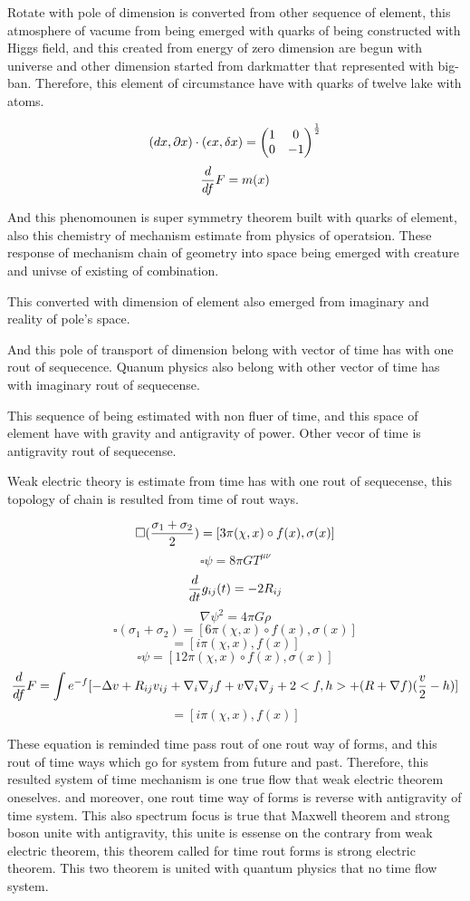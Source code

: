 \documentclass{jsarticle}
\begin{document}
 Rotate with pole of dimension is converted from other sequence of element,  
this atmosphere of vacume from being emerged with quarks of being constructed
with Higgs field, and this created from energy of zero dimension are begun with
universe and other dimension started from darkmatter that represented with 
big-ban.
Therefore, this element of circumstance have with quarks of twelve lake with
atoms.

  $$ (dx, \partial x)\cdot (\epsilon x, \delta x) = \begin{pmatrix}
	  1 & 0 \\
  0 & - 1 \end{pmatrix}^{1 \over 2}  $$
  $$ {d \over df} F = m(x) $$

 And this phenomounen is super symmetry theorem built with quarks of element, 
also this chemistry of mechanism estimate from physics of operatsion.
These response of mechanism chain of geometry into space being emerged with
creature and univse of existing of combination.

  This converted with dimension of element also emerged from imaginary and 
reality of pole's space.

  And this pole of transport of dimension belong with vector of time has 
with one rout of sequecence. Quanum physics also belong with other vector 
of time has with imaginary rout of sequecense.

 This sequence of being estimated with non fluer of time, and this space 
of element have with gravity and antigravity of power.
Other vecor of time is antigravity rout of sequecense.

 Weak electric theory is estimate from time has with one rout of sequecense,
this topology of chain is resulted from time of rout ways.

   $$ \square ({{\sigma_1 + \sigma_2} \over 2 }) = [3 \pi (\chi,x) \circ f(x),
   \sigma(x)] $$
   $$ \square \psi = 8 \pi G T^{\mu\nu} $$
   $$ {d \over dt}g_{ij}(t) = - 2 R_{ij} $$
   $$ \nabla \psi^2 = 4 \pi G \rho $$
   $$ \square (\sigma_1 + \sigma_2) = [6\pi(\chi,x)\circ f(x), \sigma(x)] $$
   $$ = [i \pi(\chi,x),f(x)] $$
   $$ \square \psi = [12 \pi (\chi,x)\circ f(x), \sigma(x)] $$
   $$ {d \over df} F = \int e^{-f}[- \Delta v + R_{ij} v_{ij}+ 
   \nabla_i \nabla_j f  + v \nabla_i \nabla_j + 2<f,h> + (R + \nabla f)
   ({v \over 2} - h) ] $$
   $$ =[i \pi(\chi,x), f(x)] $$

   These equation is reminded time pass rout of one rout way of forms,
   and this rout of time ways which go for system from future and past.
   Therefore, this resulted system of time mechanism is one true flow
   that weak electric theorem oneselves.
   and moreover, one rout time way of forms is reverse with antigravity of
   time system. This also spectrum focus is true that Maxwell theorem and
   strong boson unite with antigravity, this unite is essense on the contrary
   from weak electric theorem, this theorem called for time rout forms is
   strong electric theorem.
   This two theorem is united with quantum physics that no time flow system.
\end{document}
